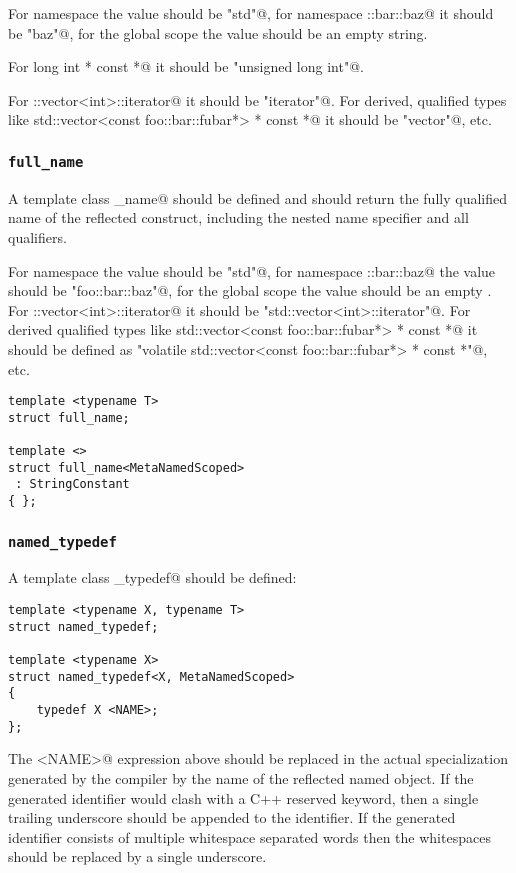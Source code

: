For namespace \verb@std@ the value should be \verb@"std"@, for namespace
\verb@foo::bar::baz@ it should be \verb@"baz"@, for the global scope the
value should be an empty string.

For \verb@unsigned long int * const *@ it should be \verb@"unsigned long int"@.

For \verb@std::vector<int>::iterator@ it should be \verb@"iterator"@. For derived,
qualified types like \verb@volatile std::vector<const foo::bar::fubar*> * const *@
it should be \verb@"vector"@, etc.

\subsubsection{\texttt{full\_name}}

A template class \verb@full_name@ should be defined and should return the fully
qualified name of the reflected construct, including the nested name specifier
and all qualifiers.

For namespace \verb@std@ the value 
should be \verb@"std"@, for namespace \verb@foo::bar::baz@ the value should
be \verb@"foo::bar::baz"@, for the global scope the value should be an empty
.
For \verb@std::vector<int>::iterator@ it should be \verb@"std::vector<int>::iterator"@.
For derived qualified types like
\verb@volatile std::vector<const foo::bar::fubar*> * const *@ it should be defined as
\verb@"volatile std::vector<const foo::bar::fubar*> * const *"@, etc.

\begin{verbatim}
template <typename T>
struct full_name;

template <>
struct full_name<MetaNamedScoped>
 : StringConstant
{ };
\end{verbatim}

\subsubsection{\texttt{named\_typedef}}

A template class \verb@named_typedef@ should be defined:

\begin{verbatim}
template <typename X, typename T>
struct named_typedef;

template <typename X>
struct named_typedef<X, MetaNamedScoped>
{
	typedef X <NAME>;
};
\end{verbatim}

The \verb@<NAME>@ expression above should be replaced in the actual specialization generated by the compiler
by the name of the reflected named object. If the generated identifier would clash with a C++
reserved keyword, then a single trailing underscore should be appended to the identifier.
If the generated identifier consists of multiple whitespace separated words then the whitespaces
should be replaced by a single underscore.

